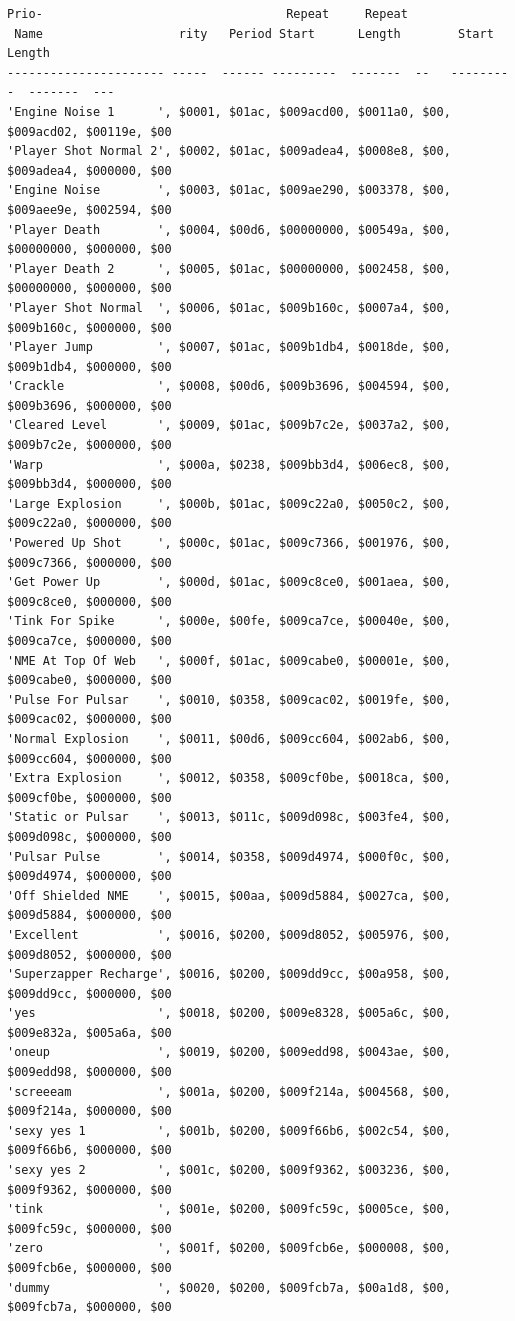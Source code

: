 \begin{lstlisting}[basicstyle=\scriptsize\ttfamily,caption=The contents of \icode{samtab} at \icode{\$9AC800}.]
                        Prio-                                  Repeat     Repeat
 Name                   rity   Period Start      Length        Start      Length      
---------------------- -----  ------ ---------  -------  --   ---------  -------  ---
'Engine Noise 1      ', $0001, $01ac, $009acd00, $0011a0, $00, $009acd02, $00119e, $00
'Player Shot Normal 2', $0002, $01ac, $009adea4, $0008e8, $00, $009adea4, $000000, $00
'Engine Noise        ', $0003, $01ac, $009ae290, $003378, $00, $009aee9e, $002594, $00
'Player Death        ', $0004, $00d6, $00000000, $00549a, $00, $00000000, $000000, $00
'Player Death 2      ', $0005, $01ac, $00000000, $002458, $00, $00000000, $000000, $00
'Player Shot Normal  ', $0006, $01ac, $009b160c, $0007a4, $00, $009b160c, $000000, $00
'Player Jump         ', $0007, $01ac, $009b1db4, $0018de, $00, $009b1db4, $000000, $00
'Crackle             ', $0008, $00d6, $009b3696, $004594, $00, $009b3696, $000000, $00
'Cleared Level       ', $0009, $01ac, $009b7c2e, $0037a2, $00, $009b7c2e, $000000, $00
'Warp                ', $000a, $0238, $009bb3d4, $006ec8, $00, $009bb3d4, $000000, $00
'Large Explosion     ', $000b, $01ac, $009c22a0, $0050c2, $00, $009c22a0, $000000, $00
'Powered Up Shot     ', $000c, $01ac, $009c7366, $001976, $00, $009c7366, $000000, $00
'Get Power Up        ', $000d, $01ac, $009c8ce0, $001aea, $00, $009c8ce0, $000000, $00
'Tink For Spike      ', $000e, $00fe, $009ca7ce, $00040e, $00, $009ca7ce, $000000, $00
'NME At Top Of Web   ', $000f, $01ac, $009cabe0, $00001e, $00, $009cabe0, $000000, $00
'Pulse For Pulsar    ', $0010, $0358, $009cac02, $0019fe, $00, $009cac02, $000000, $00
'Normal Explosion    ', $0011, $00d6, $009cc604, $002ab6, $00, $009cc604, $000000, $00
'Extra Explosion     ', $0012, $0358, $009cf0be, $0018ca, $00, $009cf0be, $000000, $00
'Static or Pulsar    ', $0013, $011c, $009d098c, $003fe4, $00, $009d098c, $000000, $00
'Pulsar Pulse        ', $0014, $0358, $009d4974, $000f0c, $00, $009d4974, $000000, $00
'Off Shielded NME    ', $0015, $00aa, $009d5884, $0027ca, $00, $009d5884, $000000, $00
'Excellent           ', $0016, $0200, $009d8052, $005976, $00, $009d8052, $000000, $00
'Superzapper Recharge', $0016, $0200, $009dd9cc, $00a958, $00, $009dd9cc, $000000, $00
'yes                 ', $0018, $0200, $009e8328, $005a6c, $00, $009e832a, $005a6a, $00
'oneup               ', $0019, $0200, $009edd98, $0043ae, $00, $009edd98, $000000, $00
'screeeam            ', $001a, $0200, $009f214a, $004568, $00, $009f214a, $000000, $00
'sexy yes 1          ', $001b, $0200, $009f66b6, $002c54, $00, $009f66b6, $000000, $00
'sexy yes 2          ', $001c, $0200, $009f9362, $003236, $00, $009f9362, $000000, $00
'tink                ', $001e, $0200, $009fc59c, $0005ce, $00, $009fc59c, $000000, $00
'zero                ', $001f, $0200, $009fcb6e, $000008, $00, $009fcb6e, $000000, $00
'dummy               ', $0020, $0200, $009fcb7a, $00a1d8, $00, $009fcb7a, $000000, $00
\end{lstlisting}

